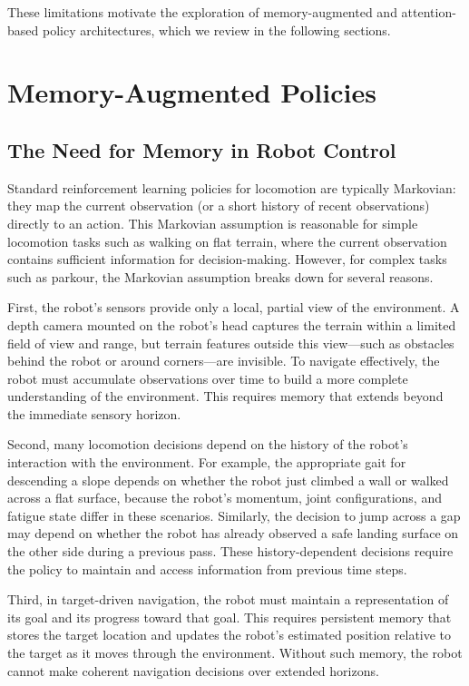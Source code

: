 These limitations motivate the exploration of memory-augmented and attention-based policy architectures, which we review in the following sections.

\section{Memory-Augmented Policies}
\label{sec:rw_memory}

\subsection{The Need for Memory in Robot Control}

Standard reinforcement learning policies for locomotion are typically Markovian: they map the current observation (or a short history of recent observations) directly to an action. This Markovian assumption is reasonable for simple locomotion tasks such as walking on flat terrain, where the current observation contains sufficient information for decision-making. However, for complex tasks such as parkour, the Markovian assumption breaks down for several reasons.

First, the robot's sensors provide only a local, partial view of the environment. A depth camera mounted on the robot's head captures the terrain within a limited field of view and range, but terrain features outside this view---such as obstacles behind the robot or around corners---are invisible. To navigate effectively, the robot must accumulate observations over time to build a more complete understanding of the environment. This requires memory that extends beyond the immediate sensory horizon.

Second, many locomotion decisions depend on the history of the robot's interaction with the environment. For example, the appropriate gait for descending a slope depends on whether the robot just climbed a wall or walked across a flat surface, because the robot's momentum, joint configurations, and fatigue state differ in these scenarios. Similarly, the decision to jump across a gap may depend on whether the robot has already observed a safe landing surface on the other side during a previous pass. These history-dependent decisions require the policy to maintain and access information from previous time steps.

Third, in target-driven navigation, the robot must maintain a representation of its goal and its progress toward that goal. This requires persistent memory that stores the target location and updates the robot's estimated position relative to the target as it moves through the environment. Without such memory, the robot cannot make coherent navigation decisions over extended horizons.

